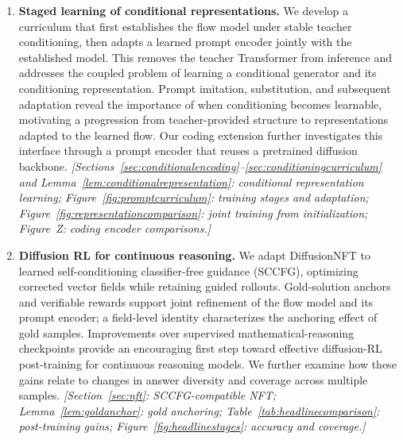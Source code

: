 \begin{enumerate}
    \item \textbf{Staged learning of conditional representations.}
    We develop a curriculum that first establishes the flow model under stable teacher conditioning, then adapts a learned prompt encoder jointly with the established model. This removes the teacher Transformer from inference and addresses the coupled problem of learning a conditional generator and its conditioning representation. Prompt imitation, substitution, and subsequent adaptation reveal the importance of when conditioning becomes learnable, motivating a progression from teacher-provided structure to representations adapted to the learned flow. Our coding extension further investigates this interface through a prompt encoder that reuses a pretrained diffusion backbone.
    \emph{[Sections~\ref{sec:conditionalencoding}--\ref{sec:conditioningcurriculum} and Lemma~\ref{lem:conditionalrepresentation}: conditional representation learning; Figure~\ref{fig:promptcurriculum}: training stages and adaptation; Figure~\ref{fig:representationcomparison}: joint training from initialization; Figure~Z: coding encoder comparisons.]}

    \item \textbf{Diffusion RL for continuous reasoning.}
    We adapt DiffusionNFT to learned self-conditioning classifier-free guidance (SCCFG), optimizing corrected vector fields while retaining guided rollouts. Gold-solution anchors and verifiable rewards support joint refinement of the flow model and its prompt encoder; a field-level identity characterizes the anchoring effect of gold samples. Improvements over supervised mathematical-reasoning checkpoints provide an encouraging first step toward effective diffusion-RL post-training for continuous reasoning models. We further examine how these gains relate to changes in answer diversity and coverage across multiple samples.
    \emph{[Section~\ref{sec:nft}: SCCFG-compatible NFT; Lemma~\ref{lem:goldanchor}: gold anchoring; Table~\ref{tab:headlinecomparison}: post-training gains; Figure~\ref{fig:headlinestages}: accuracy and coverage.]}
\end{enumerate}
